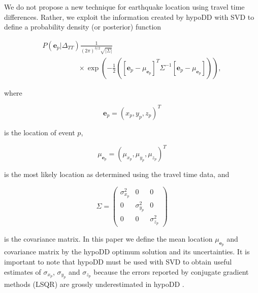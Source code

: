 \documentclass[12pt,double]{article}
\begin{document}
We do not propose a new technique for earthquake location using
travel time differences. Rather, we exploit the information created
by hypoDD with SVD to define a probability density (or posterior)
function
\begin{linenomath*} \begin{equation}
\label{eq-multi-var-Gauss-tt}
\begin{array}{l}
P(\mathbf{e}_p|\Delta_{TT})
\frac{1}{(2\pi)^{3/2}\sqrt{|\Sigma|}} \\
\hspace{5em} \times \exp
\left({-\frac{1}{2}\left([\mathbf{e}_p-\mu_{\mathbf{e}_p}]^T
\Sigma^{-1} [\mathbf{e}_p-\mu_{\mathbf{e}_p}]\right)} \right),
\end{array}
\end{equation} \end{linenomath*}
where
\begin{linenomath*} \begin{equation}
\mathbf{e}_p = (x_p,y_p,z_p)^T
\end{equation} \end{linenomath*}
is the location of event $p$,
\begin{linenomath*} \begin{equation}
\mu_{\mathbf{e}_p} = (\mu_{x_p}, \mu_{y_p},\mu_{z_p})^T
\end{equation} \end{linenomath*}
is the most likely location as determined using the travel time
data, and
\begin{linenomath*} \begin{equation}
\label{eq:Sigma-expression}
\Sigma = \left( \begin{array}{ccc} \sigma_{x_p}^2 & 0 & 0\\
0 &  \sigma_{y_p}^2 & 0 \\
0 & 0 & \sigma_{z_p}^2  \end{array} \right)
\end{equation} \end{linenomath*}
is the covariance matrix. In this paper we define the mean location
$\mu_{\mathbf{e}_p}$ and covariance matrix by the hypoDD optimum
solution and its uncertainties. It is important to note that hypoDD
must be used with SVD to obtain useful estimates of $\sigma_{x_p}$,
$\sigma_{y_p}$ and $\sigma_{z_p}$ because the errors reported by
conjugate gradient methods (LSQR) are grossly underestimated in
hypoDD \citep{dr_Waldhauser01a}.
\end{document}
